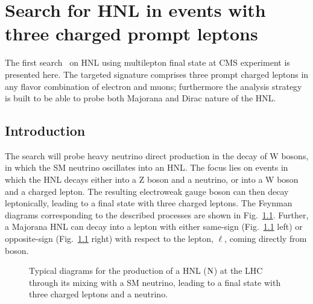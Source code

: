 \chapter{Search for HNL in events with three charged prompt
  leptons} \label{Chapter5}

The first search~\cite{Sirunyan:2018mtv} on HNL using multilepton final state at CMS
experiment is presented here. The targeted signature comprises 
three prompt charged leptons in any flavor combination of electron
and muons; furthermore the analysis strategy is built to be able to probe both
Majorana and Dirac nature of the HNL. 

\section{Introduction}
The search will probe heavy neutrino direct production in the decay of W bosons, in which the SM neutrino oscillates into an HNL. The focus lies on events in which the HNL decays either into a Z boson and a neutrino, or into a W boson and a charged lepton. The resulting electroweak gauge boson can then decay leptonically, leading to a final state with three charged leptons. The Feynman diagrams corresponding to the described processes are shown in 
Fig.~\ref{fig:c5hnldiagram}. Further, a Majorana HNL can decay into a lepton with either same-sign (Fig.~\ref{fig:c5hnldiagram} left) 
or opposite-sign (Fig.~\ref{fig:c5hnldiagram} right) with respect to the lepton, $\ell$, coming directly from \PW boson. 
\begin{figure}[h]
\noindent
{}
\caption{Typical diagrams for the production of a HNL ($\mathrm{N}$)  at the LHC 
through its mixing with a SM neutrino, leading to a
final state with three charged leptons and a neutrino.}
\label{fig:c5hnldiagram}
\end{figure}

